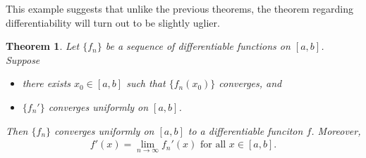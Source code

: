 \documentclass[15pt,a4paper]{book}
\newtheorem{theorem}{Theorem}[chapter]
\theoremstyle{definition}
\begin{document}
This example suggests that unlike the previous theorems, the theorem regarding differentiability will turn out to be slightly uglier.

\begin{theorem}
    Let $\{f_{n}\}$ be a sequence of differentiable functions on $[a,b]$. Suppose
    \begin{itemize}
        \item there exists $x_{0} \in [a,b]$ such that $\{f_{n}(x_{0})\}$ converges, and
        \item $\{f_{n}'\}$ converges uniformly on $[a,b]$.
    \end{itemize}
    Then $\{f_{n}\}$ converges uniformly on $[a,b]$ to a differentiable funciton $f$. Moreover,
    \begin{align*}
        f'(x) = \lim_{n \to \infty} f_{n}'(x) \text{ for all } x \in [a,b].
    \end{align*}
\end{theorem}
\end{document}
